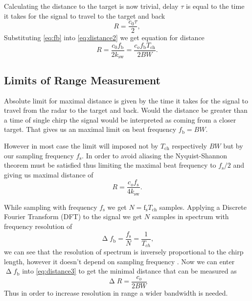 Calculating the distance to the target is now trivial, delay $\tau$ is equal to the time it takes for the signal to travel to the target and back
\begin{equation}
	R = \frac{c_0 \tau}{2},
	\label{eq:distance2}
\end{equation}
Substituting \ref{eq:fb} into \ref{eq:distance2} we get equation for distance
\begin{equation}
	R = \frac{c_0 f_\mathrm{b}}{2k_\mathrm{sw}}= \frac{c_o f_\mathrm{b} T_{\mathrm{ch}}}{2 BW}.
	\label{eq:distance3}
\end{equation}


\subsection{Limits of Range Measurement}

Absolute limit for maximal distance is given by the time it takes for the signal to travel from the radar to the target and back.
Would the distance be greater than a time of single chirp the signal would be interpreted as coming from a closer target.
That gives us an maximal limit on beat frequency $f_\mathrm{b} = BW$.

However in most case the limit will imposed not by $T_\mathrm{ch}$ respectively $BW$ but by our sampling frequency $f_\mathrm{s}$.
In order to avoid aliasing the Nyquist-Shannon theorem must be satisfied thus limiting the maximal beat frequency to $f_\mathrm{s}/2$ and giving us maximal distance of
\begin{equation}
	R = \frac{c_o f_\mathrm{s}}{4k_\mathrm{sw}}.
	\label{eq:distance4max}
\end{equation}

While sampling with frequency $f_\mathrm{s}$ we get $N =\mathrm{f}_\mathrm{s} T_\mathrm{ch}$ samples. Applying a Discrete Fourier Transform (DFT) to the signal we get $N$ samples in spectrum with frequency resolution of
\begin{equation}
	\upDelta f_\mathrm{b} = \frac{f_\mathrm{s}}{N} = \frac{1}{T_{ch}},
	\label{eq:resolution}
\end{equation}
we can see that the resolution of spectrum is inversely proportional to the chirp length, however it doesn't depend on sampling frequency \cite{jankiraman2018}.
Now we can enter $\upDelta f_\mathrm{b}$ into \ref{eq:distance3} to get the minimal distance that can be measured as
\begin{equation}
	\upDelta R = \frac{c_o}{2BW}
	\label{eq:distance5min}
\end{equation}
Thus in order to increase resolution in range a wider bandwidth is needed.





